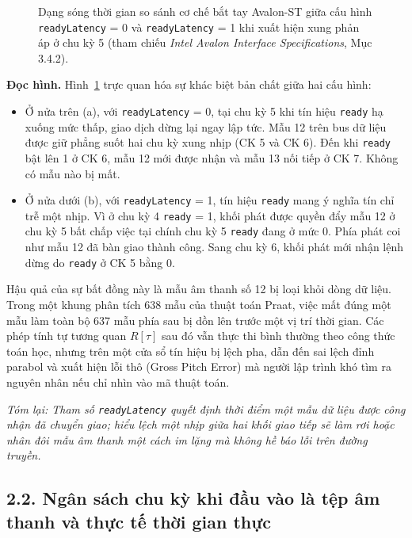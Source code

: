 \begin{figure}[htbp]
\centering

\caption{Dạng sóng thời gian so sánh cơ chế bắt tay Avalon-ST giữa cấu hình \texttt{readyLatency} = 0 và \texttt{readyLatency} = 1 khi xuất hiện xung phản áp ở chu kỳ 5 (tham chiếu \emph{Intel Avalon Interface Specifications}, Mục 3.4.2).}
\label{fig:ch02_readylatency}
\end{figure}

\textbf{Đọc hình.} Hình~\ref{fig:ch02_readylatency} trực quan hóa sự khác biệt bản chất giữa hai cấu hình:
\begin{itemize}[leftmargin=1.5em, itemsep=2pt]
    \item Ở nửa trên (a), với \texttt{readyLatency} = 0, tại chu kỳ 5 khi tín hiệu \texttt{ready} hạ xuống mức thấp, giao dịch dừng lại ngay lập tức. Mẫu 12 trên bus dữ liệu được giữ phẳng suốt hai chu kỳ xung nhịp (CK 5 và CK 6). Đến khi \texttt{ready} bật lên 1 ở CK 6, mẫu 12 mới được nhận và mẫu 13 nối tiếp ở CK 7. Không có mẫu nào bị mất.
    \item Ở nửa dưới (b), với \texttt{readyLatency} = 1, tín hiệu \texttt{ready} mang ý nghĩa tín chỉ trễ một nhịp. Vì ở chu kỳ 4 \texttt{ready} = 1, khối phát được quyền đẩy mẫu 12 ở chu kỳ 5 bất chấp việc tại chính chu kỳ 5 \texttt{ready} đang ở mức 0. Phía phát coi như mẫu 12 đã bàn giao thành công. Sang chu kỳ 6, khối phát mới nhận lệnh dừng do \texttt{ready} ở CK 5 bằng 0.
\end{itemize}

Hậu quả của sự bất đồng này là mẫu âm thanh số 12 bị loại khỏi dòng dữ liệu. Trong một khung phân tích 638 mẫu của thuật toán Praat, việc mất đúng một mẫu làm toàn bộ 637 mẫu phía sau bị dồn lên trước một vị trí thời gian. Các phép tính tự tương quan $R[\tau]$ sau đó vẫn thực thi bình thường theo công thức toán học, nhưng trên một cửa sổ tín hiệu bị lệch pha, dẫn đến sai lệch đỉnh parabol và xuất hiện lỗi thô (Gross Pitch Error) mà người lập trình khó tìm ra nguyên nhân nếu chỉ nhìn vào mã thuật toán.

\textit{Tóm lại: Tham số \texttt{readyLatency} quyết định thời điểm một mẫu dữ liệu được công nhận đã chuyển giao; hiểu lệch một nhịp giữa hai khối giao tiếp sẽ làm rơi hoặc nhân đôi mẫu âm thanh một cách im lặng mà không hề báo lỗi trên đường truyền.}

\subsection*{2.2. Ngân sách chu kỳ khi đầu vào là tệp âm thanh và thực tế thời gian thực}

